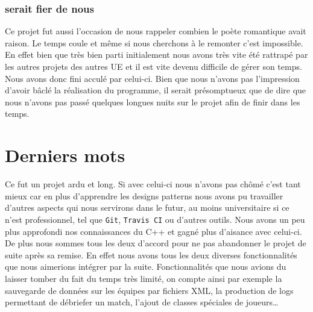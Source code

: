 \documentclass{article}
\newcommand{\info}{\texttt}
\begin{document}
        \subsubsection{ serait fier de nous}
        
            Ce projet fut aussi l'occasion de nous rappeler combien le poète romantique avait raison. Le temps coule et même si nous cherchons à le remonter c'est impossible. En effet bien que très bien parti initialement nous avons très vite été rattrapé par les autres projets des autres UE et il est vite devenu difficile de gérer son temps. Nous avons donc fini acculé par celui-ci. Bien que nous n'avons pas l'impression d'avoir bâclé la réalisation du programme, il serait présomptueux que de dire que nous n'avons pas passé quelques longues nuits sur le projet afin de finir dans les temps. 
    
\section{Derniers mots}

    Ce fut un projet ardu et long. Si avec celui-ci nous n'avons pas chômé c'est tant mieux car en plus d'apprendre les designs patterns nous avons pu travailler d'autres aspects qui nous servirons dans le futur, au moins universitaire si ce n'est professionnel, tel que \info{Git}, \info{Travis CI} ou d'autres outils. Nous avons un peu plus approfondi nos connaissances du C++ et gagné plus d'aisance avec celui-ci.\\
    De plus nous sommes tous les deux d'accord pour ne pas abandonner le projet de suite après sa remise. En effet nous avons tous les deux diverses fonctionnalités que nous aimerions intégrer par la suite. Fonctionnalités que nous avions du laisser tomber du fait du temps très limité, on compte ainsi par exemple la sauvegarde de données sur les équipes par fichiers XML, la production de logs permettant de débriefer un match, l'ajout de classes spéciales de joueurs\dots

\end{document}
